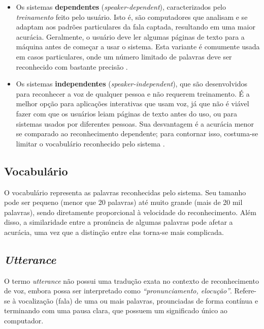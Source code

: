 \begin{itemize}
\item Os sistemas \textbf{dependentes} (\textit{speaker-dependent}), caracterizados pelo \emph{treinamento} feito pelo usuário. Isto é, são computadores que analisam e se adaptam aos padrões particulares da fala captada, resultando em uma maior acurácia. Geralmente, o usuário deve ler algumas páginas de texto para a máquina antes de começar a usar o sistema. Esta variante é comumente usada em casos particulares, onde um número limitado de palavras deve ser reconhecido com bastante precisão \citep{speakerDependency}.

\item Os sistemas \textbf{independentes} (\textit{speaker-independent}), que são desenvolvidos para reconhecer a voz de qualquer pessoa e não requerem treinamento. É a melhor opção para aplicações interativas que usam voz, já que não é viável fazer com que os usuários leiam páginas de texto antes do uso, ou para sistemas usados por diferentes pessoas. Sua desvantagem é a acurácia menor se comparado ao reconhecimento dependente; para contornar isso, costuma-se limitar o vocabulário reconhecido pelo sistema \citep{speakerDependency}.
\end{itemize}


\subsection{Vocabulário}

O vocabulário representa as palavras reconhecidas pelo sistema. Seu tamanho pode ser pequeno (menor que 20 palavras) até muito grande (mais de 20 mil palavras), sendo diretamente proporcional à velocidade do reconhecimento. Além disso, a similaridade entre a pronúncia de algumas palavras pode afetar a acurácia, uma vez que a distinção entre elas torna-se mais complicada.


\subsection{\textit{Utterance}}

O termo \textit{utterance} não possui uma tradução exata no contexto de reconhecimento de voz, embora possa ser interpretado como \textit{``pronunciamento, elocução''}. Refere-se à vocalização (fala) de uma ou mais palavras, prounciadas de forma contínua e terminando com uma pausa clara, que possuem um significado único ao computador.

